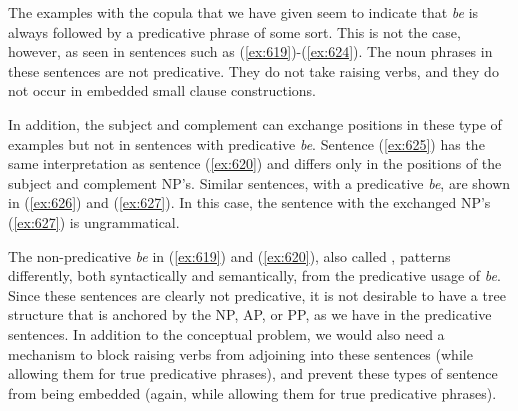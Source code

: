 The examples with the copula that we have given seem to indicate that {\it be} 
is always followed by a predicative phrase of some sort.  This is not the case, 
however, as seen in sentences such as ({\ref{ex:619}})-({\ref{ex:624}}).  The noun phrases in 
these sentences are not predicative.  They do not take raising verbs, and they 
do not occur in embedded small clause constructions. 
 
\beginsentences
{}\label{ex:619} 
\label{ex:620} 
\endsentences

 
\beginsentences
{}\label{ex:621} 
\label{ex:622} 
\endsentences

 
\beginsentences
{}\label{ex:623} 
\label{ex:624} 
\endsentences

 
In addition, the subject and complement can exchange positions in these type of 
examples but not in sentences with predicative {\it be}.  Sentence ({\ref{ex:625}}) 
has the same interpretation as sentence ({\ref{ex:620}}) and differs only in the 
positions of the subject and complement NP's. Similar sentences, with a 
predicative {\it be}, are shown in ({\ref{ex:626}}) and ({\ref{ex:627}}).  In this case, 
the sentence with the exchanged NP's ({\ref{ex:627}}) is ungrammatical. 
 
\beginsentences
{}\label{ex:625} 
\label{ex:626} 
\label{ex:627} 
\endsentences

 
The non-predicative {\it be} in ({\ref{ex:619}}) and ({\ref{ex:620}}), also called 
, patterns differently, both syntactically and 
semantically, from the predicative usage of {\it be}.  Since these sentences 
are clearly not predicative, it is not desirable to have a tree structure that 
is anchored by the NP, AP, or PP, as we have in the predicative sentences.  In 
addition to the conceptual problem, we would also need a mechanism to block 
raising verbs from adjoining into these sentences (while allowing them for true 
predicative phrases), and prevent these types of sentence from being embedded 
(again, while allowing them for true predicative phrases).  
 
